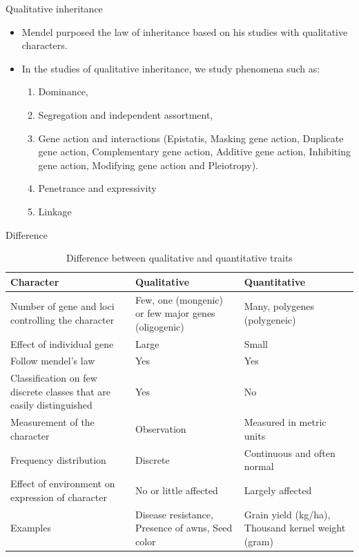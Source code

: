 \documentclass[11pt,dvipsnames,ignorenonframetext,aspectratio=169]{beamer}
\providecommand{\tightlist}{%
  \setlength{\itemsep}{0pt}\setlength{\parskip}{0pt}}
\begin{document}
\begin{frame}{Qualitative inheritance}
\protect\hypertarget{qualitative-inheritance}{}

\begin{itemize}
\tightlist
\item
  Mendel purposed the law of inheritance based on his studies with
  qualitative characters.
\item
  In the studies of qualitative inheritance, we study phenomena such as:

  \begin{enumerate}
  \tightlist
  \item
    Dominance,
  \item
    Segregation and independent assortment,
  \item
    Gene action and interactions (Epistatis, Masking gene action,
    Duplicate gene action, Complementary gene action, Additive gene
    action, Inhibiting gene action, Modifying gene action and
    Pleiotropy).
  \item
    Penetrance and expressivity
  \item
    Linkage
  \end{enumerate}
\end{itemize}

\end{frame}

\begin{frame}{Difference}
\protect\hypertarget{difference}{}

\begin{table}[t]

\caption{\label{tab:quality-quantity-difference}Difference between qualitative and quantitative traits}
\centering
\fontsize{6}{8}\selectfont
\begin{tabular}{>{\raggedright\arraybackslash}p{12em}>{\raggedright\arraybackslash}p{12em}>{\raggedright\arraybackslash}p{12em}}
\toprule
Character & Qualitative & Quantitative\\
\midrule
Number of gene and loci controlling the character & Few, one (mongenic) or few major genes (oligogenic) & Many, polygenes (polygeneic)\\
Effect of individual gene & Large & Small\\
Follow mendel's law & Yes & Yes\\
Classification on few discrete classes that are easily distinguished & Yes & No\\
Measurement of the character & Observation & Measured in metric units\\
\addlinespace
Frequency distribution & Discrete & Continuous and often normal\\
Effect of environment on expression of character & No or little affected & Largely affected\\
Examples & Disease resistance, Presence of awns, Seed color & Grain yield (kg/ha), Thousand kernel weight (gram)\\
\bottomrule
\end{tabular}
\end{table}

\end{frame}
\end{document}
